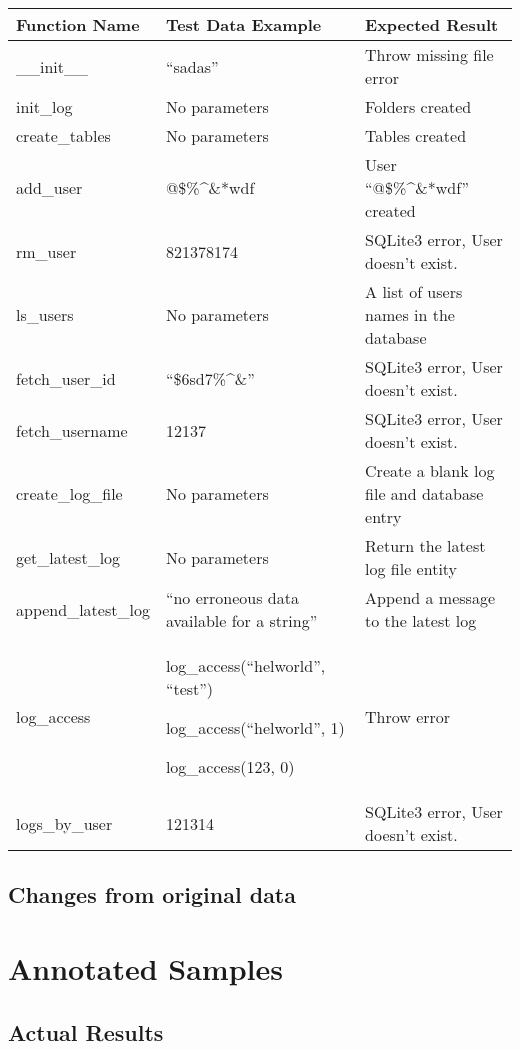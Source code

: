 \documentclass[12pt,a4paper]{report}
\begin{document}
\tablehead{}
\begin{supertabular}{|m{5.097cm}|m{5.099cm}|m{5.1060004cm}|}
\hline
\textbf{Function Name} &
\textbf{Test Data Example} &
\textbf{Expected Result}\\\hline
\_\_init\_\_ &
“sadas” &
Throw missing file error\\\hline
init\_log &
No parameters &
Folders created\\\hline
create\_tables &
No parameters &
Tables created\\\hline
add\_user &
@\$\%\^{}\&*wdf &
User “@\$\%\^{}\&*wdf” created\\\hline
rm\_user &
821378174 &
SQLite3 error, User doesn’t exist.\\\hline
ls\_users &
No parameters &
A list of users names in the database\\\hline
fetch\_user\_id &
“\$6sd7\%\^{}\&” &
SQLite3 error, User doesn’t exist.\\\hline
fetch\_username &
12137 &
SQLite3 error, User doesn’t exist.\\\hline
create\_log\_file &
No parameters &
Create a blank log file and database entry\\\hline
get\_latest\_log &
No parameters &
Return the latest log file entity\\\hline
append\_latest\_log &
“no erroneous data available for a string” &
Append a message to the latest log\\\hline
log\_access &
log\_access(“helworld”, “test”)

log\_access(“helworld”, 1)

log\_access(123, 0) &
Throw error\\\hline
logs\_by\_user &
121314 &
SQLite3 error, User doesn’t exist.\\\hline
\end{supertabular}


\bigskip

\subsection{Changes from original data}
\section{Annotated Samples}
\subsection{Actual Results}
\end{document}
